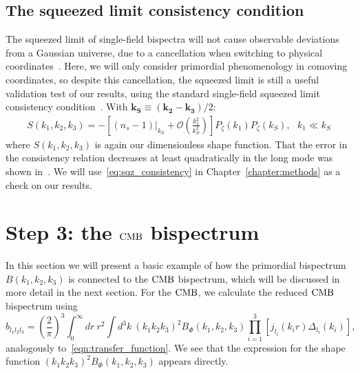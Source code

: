     \subsection{The squeezed limit consistency condition}
The squeezed limit of single-field bispectra will not cause
observable deviations from a Gaussian universe,
due to a cancellation when switching to physical coordinates~\cite{Cabass_2016}.
Here, we will only consider primordial phenomenology
in comoving coordinates, so despite this cancellation,
the squeezed limit is still a useful validation test of our results,
using the standard single-field squeezed limit consistency condition~\cite{sqz_consistency,not_so_sqz}.
With $\mathbf{k_S}\equiv\left(\mathbf{k_2}-\mathbf{k_3}\right)/2 $:
\begin{align}\label{eq:sqz_consistency}
    S(k_1,k_2,k_3) = -\left[(n_s-1)|_{k_S}+\mathcal{O}\left(\frac{k_1^2}{k_S^2}\right)\right]P_{\zeta}(k_1)P_{\zeta}(k_S),
\ \ \  k_1\ll k_S
\end{align}
where $S(k_1,k_2,k_3)$ is again our dimensionless shape function.
That the error in the consistency relation decreases at least quadratically
in the long mode was shown in~\cite{not_so_sqz}.
We will use~\eqref{eq:sqz_consistency} in Chapter~\ref{chapter:methods}
as a check on our results.


\section{Step 3: the $\text{CMB}$ bispectrum}
    In this section we will present a basic example of how the primordial bispectrum
    $B(k_1, k_2, k_3)$ is connected to the $\text{CMB}$ bispectrum, which will be discussed in more
    detail in the next section.
    For the $\text{CMB}$, we calculate the reduced $\text{CMB}$ bispectrum using~\cite{FergShell_2}
    \begin{equation}
    \label{eq:reduced_cmb}
    b_{l_1l_2l_3} = \left(\frac{2}{\pi}\right)^3\int_{0}^{\infty}dr~r^2
        \int d^3k~(k_1k_2k_3)^2 B_{\Phi}(k_1,k_2,k_3)\prod_{i=1}^{3}\left[j_{l_i}(k_ir)\Delta_{l_i}(k_i)\right],
    \end{equation}
    analogously to~\eqref{eqn:transfer_function}.
    We see that the expression for the shape function $(k_1k_2k_3)^2 B_{\Phi}(k_1,k_2,k_3)$ appears directly.


